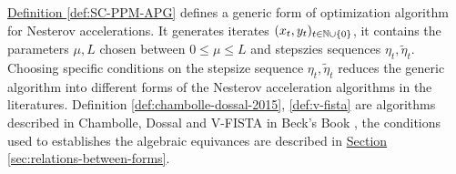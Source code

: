 \documentclass[12pt]{article}
\begin{document}
        \hyperref[def:SC-PPM-APG]{Definition \ref*{def:SC-PPM-APG}} defines a generic form of optimization algorithm for Nesterov accelerations. 
        It generates iterates $(x_t, y_t)_{t \in \mathbb N \cup \{0\}}$, it contains the parameters $\mu, L$ chosen between $0 \le \mu \le L$ and stepszies sequences $\eta_t, \tilde \eta_t$. 
        Choosing specific conditions on the stepsize sequence $\eta_t, \tilde \eta_t$ reduces the generic algorithm into different forms of the Nesterov acceleration algorithms in the literatures.
        Definition 
        \hyperref[def:chambolle-dossal-2015]{\ref*{def:chambolle-dossal-2015}}, 
        \hyperref[def:v-fista]{\ref*{def:v-fista}} 
        are algorithms described in Chambolle, Dossal \cite{chambolle_convergence_2015} and V-FISTA in Beck's Book \cite{beck_first-order_2017}, the conditions used to establishes the algebraic equivances are described in 
        \hyperref[sec:relations-between-forms]{Section \ref*{sec:relations-between-forms}}. 

        
\end{document}
